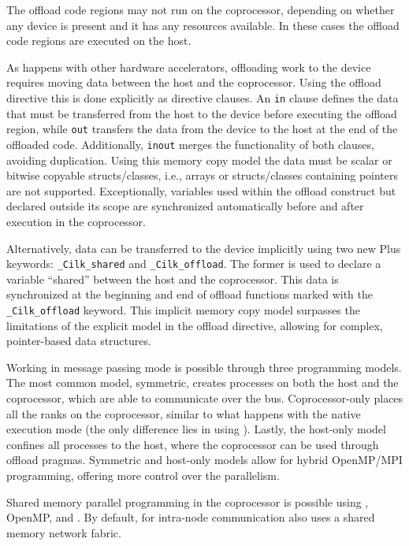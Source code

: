 \documentclass[../thesis]{subfiles}
\begin{document}
	The offload code regions may not run on the coprocessor, depending on whether any device is present and it has any resources available. In these cases the offload code regions are executed on the host.

	As happens with other hardware accelerators, offloading work to the device requires moving data between the host and the coprocessor. Using the offload directive this is done explicitly as directive clauses. An \texttt{in} clause defines the data that must be transferred from the host to the device before executing the offload region, while \texttt{out} transfers the data from the device to the host at the end of the offloaded code. Additionally, \texttt{inout} merges the functionality of both clauses, avoiding duplication. Using this memory copy model the data must be scalar or bitwise copyable structs/classes, i.e., arrays or structs/classes containing pointers are not supported. Exceptionally, variables used within the offload construct but declared outside its scope are synchronized automatically before and after execution in the coprocessor.

	Alternatively, data can be transferred to the device implicitly using two new \intel\cilk Plus keywords: \texttt{\_Cilk\_shared} and \texttt{\_Cilk\_offload}. The former is used to declare a variable ``shared'' between the host and the coprocessor. This data is synchronized at the beginning and end of offload functions marked with the \texttt{\_Cilk\_offload} keyword. This implicit memory copy model surpasses the limitations of the explicit model in the offload directive, allowing for complex, pointer-based data structures.

	Working in message passing mode is possible through three \mpi programming models. The most common model, symmetric, creates \mpi processes on both the host and the coprocessor, which are able to communicate over the \pcie bus. Coprocessor-only places all the \mpi ranks on the coprocessor, similar to what happens with the native execution mode (the only difference lies in using \mpi). Lastly, the host-only model confines all processes to the host, where the coprocessor can be used through offload pragmas. Symmetric and host-only models allow for hybrid OpenMP/MPI programming, offering more control over the parallelism.

	Shared memory parallel programming in the coprocessor is possible using \pthreads, OpenMP, \intel\tbb and \intel\cilk. By default, for intra-node communication \mpi also uses a shared memory network fabric.
\end{document}
